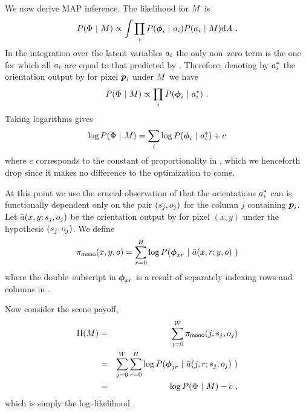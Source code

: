We now derive MAP inference. The likelihood for $\Scene$ is
\begin{equation}
  \label{eq:photometric-lik-full}
  P(\Features ~|~ \Scene) \propto 
  \int
    \prod_i P(\Feature_i ~|~ \Orient_i) 
            P(\Orient_i ~|~ \Scene)
  \intd \Orients ~.
\end{equation}
In the integration over the latent variables $\Orient_i$ the only
non--zero term is the one for which all $\Orient_i$ are equal to that
predicted by . Therefore, denoting by
$\PredictedOrient_i$ the orientation output by
 for pixel $\Pixel_i$ under $\Scene$ we
have
\begin{equation}
  \label{eq:photometric-lik}
  P(\Features ~|~ \Scene) \propto
    \prod_i P(\Feature_i ~|~ \PredictedOrient_i) ~.
\end{equation}
Taking logarithms gives
\begin{equation}
  \label{eq:photometric-loglik}
  \log P(\Features ~|~ \Scene) =
    \sum_i \log P(\Feature_i ~|~ \Orient_i^*) + c
\end{equation}
where $c$ corresponds to the constant of proportionality in
, which we henceforth drop since it makes no
difference to the optimization to come. 

At this point we use the crucial observation of
 that the orientations
$\PredictedOrient_i$ can is functionally dependent only on the pair
$(\seam_j,\WallOrient_j)$ for the column $j$ containing
$\Pixel_i$. Let $\ComputedOrient(x,y;\seam_j,\WallOrient_j)$ be the
orientation output by  for pixel $(x,y)$
under the hypothesis $(\seam_j,\WallOrient_j)$. We define
\begin{equation}
  \label{eq:mono-payoffs}
  \MonoPayoff(x,y,\WallOrient) = \sum_{r=0}^H \log 
    P(\Feature_{xr} ~|~ \ComputedOrient(x,r;y,\WallOrient)~)
\end{equation}
where the double--subscript in $\Feature_{xr}$ is a result of
separately indexing rows and columns in \label{eq:mono-payoffs}. 

Now consider the scene payoff,
\begin{eqnarray}
  \ScenePayoff(\Scene) &=& 
    \sum_{j=0}^W \MonoPayoff(j, \seam_j, \WallOrient_j) \\
  &=& 
    \sum_{j=0}^W \sum_{r=0}^H \log
      P(\Feature_{jr} ~|~ \ComputedOrient(j,r;\seam_j,\WallOrient_j)~)\\
  &=&
    \log P(\Features ~|~ \Scene) - c  ~,
\end{eqnarray}
which is simply the log--likelihood .

